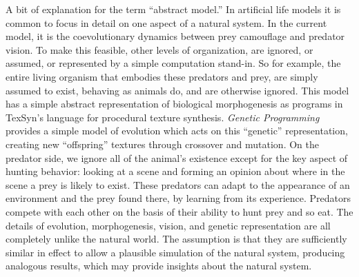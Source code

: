 \documentclass[sigconf]{acmart}
\begin{document}
\par
A bit of explanation for the term “abstract model.” In artificial life models it is common to focus in detail on one aspect of a natural system. In the current model, it is the coevolutionary dynamics between prey camouflage and predator vision. To make this feasible, other levels of organization, are ignored, or assumed, or represented by a simple computation stand-in. So for example, the entire living organism that embodies these predators and prey, are simply assumed to exist, behaving as animals do, and are otherwise ignored. This model has a simple abstract representation of biological morphogenesis as programs in TexSyn's language for procedural texture synthesis. \textit{Genetic Programming} provides a simple model of evolution which acts on this “genetic” representation, creating new “offspring” textures through crossover and mutation. On the predator side, we ignore all of the animal's existence except for the key aspect of hunting behavior: looking at a scene and forming an opinion about where in the scene a prey is likely to exist. These predators can adapt to the appearance of an environment and the prey found there, by learning from its experience. Predators compete with each other on the basis of their ability to hunt prey and so eat. The details of evolution, morphogenesis, vision, and genetic representation are all completely unlike the natural world. The assumption is that they are sufficiently similar in effect to allow a plausible simulation of the natural system, producing analogous results, which may provide insights about the natural system.
\end{document}
